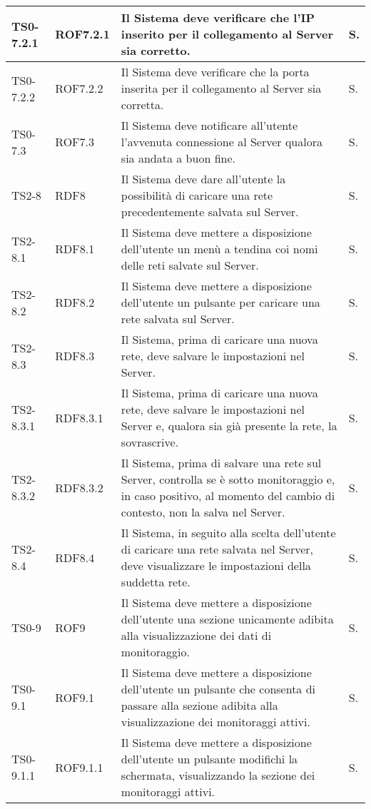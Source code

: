 \begin{longtable}{|C{.15\textwidth}|C{.14\textwidth}|m{.52\textwidth}|m{.08\textwidth}|}
\hline
TS0-7.2.1 & ROF7.2.1 & Il Sistema deve verificare che l'IP inserito per il collegamento al Server sia corretto. & S. \\
\hline
{}TS0-7.2.2 & ROF7.2.2 & Il Sistema deve verificare che la porta inserita per il collegamento al Server sia corretta. & S. \\
\hline
TS0-7.3 & ROF7.3 & Il Sistema deve notificare all'utente l'avvenuta connessione al Server qualora sia andata a buon fine.  & S. \\
\hline
{}TS2-8 & RDF8 & Il Sistema deve dare all'utente la possibilità di caricare una rete precedentemente salvata sul Server. & S. \\
\hline
TS2-8.1 & RDF8.1 & Il Sistema deve mettere a disposizione dell'utente un menù a tendina coi nomi delle reti salvate sul Server. & S. \\
\hline
{}TS2-8.2 & RDF8.2 & Il Sistema deve mettere a disposizione dell'utente un pulsante per caricare una rete salvata sul Server. & S. \\
\hline
TS2-8.3 & RDF8.3 & Il Sistema, prima di caricare una nuova rete, deve salvare le impostazioni nel Server. & S. \\
\hline
{}TS2-8.3.1 & RDF8.3.1 & Il Sistema, prima di caricare una nuova rete, deve salvare le impostazioni nel Server e, qualora sia già presente la rete, la sovrascrive. & S. \\
\hline
TS2-8.3.2 & RDF8.3.2 & Il Sistema, prima di salvare una rete sul Server, controlla se è sotto monitoraggio e, in caso positivo, al momento del cambio di contesto, non la salva nel Server. & S. \\
\hline
{}TS2-8.4 & RDF8.4 & Il Sistema, in seguito alla scelta dell'utente di caricare una rete salvata nel Server, deve visualizzare le impostazioni della suddetta rete. & S. \\
\hline
TS0-9 & ROF9 & Il Sistema deve mettere a disposizione dell'utente una sezione unicamente adibita alla visualizzazione dei dati di monitoraggio. & S. \\
\hline
{}TS0-9.1 & ROF9.1 & Il Sistema deve mettere a disposizione dell'utente un pulsante che consenta di passare alla sezione adibita alla visualizzazione dei monitoraggi attivi. & S. \\
\hline
TS0-9.1.1 & ROF9.1.1 & Il Sistema deve mettere a disposizione dell'utente un pulsante modifichi la schermata, visualizzando la sezione dei monitoraggi attivi. & S. \\

\end{longtable}

